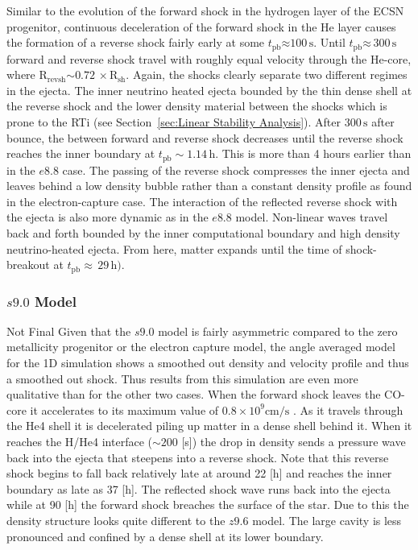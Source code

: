 \documentclass[fleqn,usenatbib]{mnras}
\newcommand{\tpb}{\ensuremath{t_{\text{pb}}}}
\newcommand{\s}{\ensuremath{\text{s}}}
\newcommand{\COM}[1]{{\color{orange}#1}}
\begin{document}
Similar to the evolution of the forward shock in the hydrogen layer of the ECSN progenitor, continuous deceleration of the forward shock in the He layer causes the formation of a reverse shock fairly early at some $\tpb\mathord{\approx} 100\,\s$. Until $\tpb\mathord{\approx}\, 300\,\s$ forward and reverse shock travel with roughly equal velocity through the He-core, where $\mathrm{R_{revsh}\mathord{\sim 0.72}\,\times R_{sh}}$. 
Again, the shocks clearly separate two different regimes in the ejecta. The inner neutrino heated ejecta bounded by the thin dense shell at the reverse shock and the lower density material between the shocks which is prone to the RTi (see Section~\ref{sec:Linear Stability Analysis}).
%
After $300\,\s$ after bounce, the between forward and reverse shock decreases until the reverse shock reaches the inner boundary at $t_{\mathrm{pb}}\sim 1.14\,\text{h}$. This is more than 4 hours earlier than in the $e8.8$ case. The passing of the reverse shock compresses the inner ejecta and leaves behind a low density bubble rather than a constant density profile as found in the electron-capture case.
The interaction of the reflected reverse shock with the ejecta is also more dynamic as in the $e8.8$ model. Non-linear waves travel back and forth bounded by the inner computational boundary and high density neutrino-heated ejecta. From here, matter expands until the time of shock-breakout at $\tpb\approx\, 29\,\mathrm{h})$. %


\subsubsection{$s9.0$ Model}
\label{sec:Long term evolution of the s9.0 model}
\COM{Not Final}
Given that the $s9.0$ model is fairly asymmetric compared to the zero metallicity progenitor or the electron capture model, the angle averaged model for the 1D simulation shows a smoothed out density and velocity profile and thus a smoothed out shock. Thus results from this simulation are even more qualitative than for the other two cases.
When the forward shock leaves the CO-core it accelerates to its maximum value of $0.8\times 10^{9}\mathrm{cm/s}$ . As it travels through the He4 shell it is decelerated piling up matter in a dense shell behind it. When it reaches the H/He4 interface ($\sim 200$ [s]) the drop in density sends a pressure wave back into the ejecta that steepens into a reverse shock. Note that this reverse shock begins to fall back relatively late at around 22 [h] and reaches the inner boundary as late as 37 [h]. The reflected shock wave runs back into the ejecta while at 90 [h] the forward shock breaches the surface of the star. Due to this the density structure looks quite different to the $z9.6$ model. The large cavity is less pronounced and confined by a dense shell at its lower boundary. 
\end{document}
